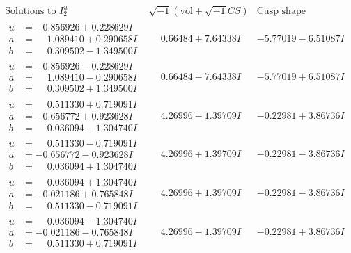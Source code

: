 \documentclass[1p]{elsarticle_modified}
\theoremstyle{definition}
\newcommand{\I}{\sqrt{-1}}
\begin{document}
$$\begin{array}{c|c|c}  
\text{Solutions to }I^u_{2}& \I (\text{vol} + \sqrt{-1}CS) & \text{Cusp shape}\\
 \hline 
\begin{aligned}
u &= -0.856926 + 0.228629 I \\
a &= \phantom{-}1.089410 + 0.290658 I \\
b &= \phantom{-}0.309502 - 1.349500 I\end{aligned}
 & \phantom{-}0.66484 + 7.64338 I & -5.77019 - 6.51087 I \\ \hline\begin{aligned}
u &= -0.856926 - 0.228629 I \\
a &= \phantom{-}1.089410 - 0.290658 I \\
b &= \phantom{-}0.309502 + 1.349500 I\end{aligned}
 & \phantom{-}0.66484 - 7.64338 I & -5.77019 + 6.51087 I \\ \hline\begin{aligned}
u &= \phantom{-}0.511330 + 0.719091 I \\
a &= -0.656772 + 0.923628 I \\
b &= \phantom{-}0.036094 - 1.304740 I\end{aligned}
 & \phantom{-}4.26996 - 1.39709 I & -0.22981 + 3.86736 I \\ \hline\begin{aligned}
u &= \phantom{-}0.511330 - 0.719091 I \\
a &= -0.656772 - 0.923628 I \\
b &= \phantom{-}0.036094 + 1.304740 I\end{aligned}
 & \phantom{-}4.26996 + 1.39709 I & -0.22981 - 3.86736 I \\ \hline\begin{aligned}
u &= \phantom{-}0.036094 + 1.304740 I \\
a &= -0.021186 + 0.765848 I \\
b &= \phantom{-}0.511330 - 0.719091 I\end{aligned}
 & \phantom{-}4.26996 + 1.39709 I & -0.22981 - 3.86736 I \\ \hline\begin{aligned}
u &= \phantom{-}0.036094 - 1.304740 I \\
a &= -0.021186 - 0.765848 I \\
b &= \phantom{-}0.511330 + 0.719091 I\end{aligned}
 & \phantom{-}4.26996 - 1.39709 I & -0.22981 + 3.86736 I \\ \hline\begin{aligned}

\end{aligned}
\end{array}$$
\end{document}
